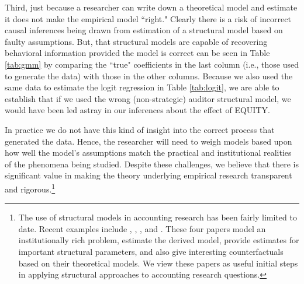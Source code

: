 \documentclass[12pt,reqno,titlepage]{amsart}
\theoremstyle{definition}
\begin{document}
\begin{doublespace}
Third, just because a researcher can write down a theoretical model and estimate it does not make the empirical model ``right."
Clearly there is a risk of incorrect causal inferences being drawn from estimation of a structural model based on faulty assumptions.
But, that structural models are capable of recovering behavioral information provided the model is correct can be seen in Table \ref{tab:gmm} by comparing the ``true" coefficients in the last column (i.e., those used to generate the data) with those in the other columns.
Because we also used the same data to estimate the logit regression in Table \ref{tab:logit}, we are able to establish that if we used the wrong (non-strategic) auditor structural model, we would have been led astray in our inferences about the effect of EQUITY.

In practice we do not have this kind of insight into the correct process that generated the data.
Hence, the researcher will need to weigh models based upon how well the model's assumptions match the practical and institutional realities of the phenomena being studied.
Despite these challenges, we believe that there is significant value in making the theory underlying empirical research transparent and rigorous.\footnote{The use of structural models in accounting research has been fairly limited to date.  
Recent examples include \citet{Gerakos:2013cl}, \citet{Gerakos:2015aa}, \citet{Zakolyukina:2015aa}, and \citet{Bertomeu:2015aa}.  
These four papers model an institutionally rich problem, estimate the derived model, provide estimates for important structural parameters, and also give interesting counterfactuals based on their theoretical models. 
We view these papers as useful initial steps in applying structural approaches to accounting research questions.}


\end{doublespace}
\end{document}
